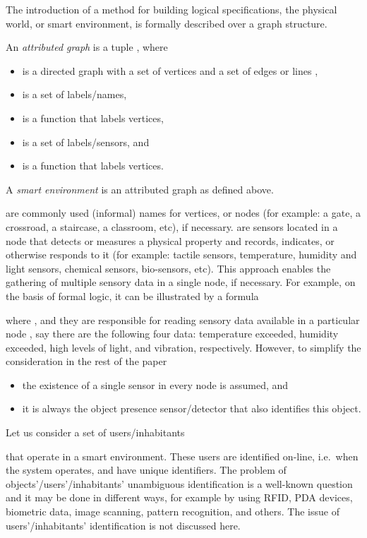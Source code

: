 \documentclass[runningheads,a4paper]{llncs}
\begin{document}
The introduction of a method for building logical specifications,
the physical world, or smart environment, is formally described over a graph structure.
\begin{definition}
An \emph{attributed graph}  is a tuple
, where
\begin{itemize}
\item  is a directed graph with a set of vertices 
and a set of edges or lines ,
\item  is a set of labels/names,
\item  is a function that labels vertices,
\item  is a set of labels/sensors, and
\item  is a function that labels vertices.
\end{itemize}
A \emph{smart environment}  is an attributed graph as defined above.
\end{definition}
 are commonly used (informal) names for vertices, or nodes
(for example: a gate, a crossroad, a staircase, a classroom, etc),
if necessary.
 are sensors located in a node
that detects or measures a physical property and records, indicates, or otherwise responds to it
(for example: tactile sensors,
temperature, humidity and light sensors,
chemical sensors, bio-sensors, etc).
This approach enables the gathering of multiple sensory data in a single node, if necessary.
For example,
on the basis of formal logic,
it can be illustrated by a formula

where ,
and they are responsible for reading sensory data available in a particular node ,
say there are the following four data:
temperature exceeded,
humidity exceeded,
high levels of light, and
vibration, respectively.
However,
to simplify the consideration in the rest of the paper
\begin{itemize}
  \item the existence of a single sensor in every node is assumed, and
  \item it is always the object presence sensor/detector that also identifies this object.
\end{itemize}

Let us consider a set of users/inhabitants

that operate in a smart environment.
These users are identified on-line,
i.e.\ when the system operates, and have unique identifiers.
The problem of objects'/users'/inhabitants' unambiguous identification is
a well-known question and it may be done in different ways,
for example by using RFID, PDA devices, biometric data, image scanning, pattern recognition, and others.
The issue of users'/inhabitants' identification is not discussed here.
\end{document}
